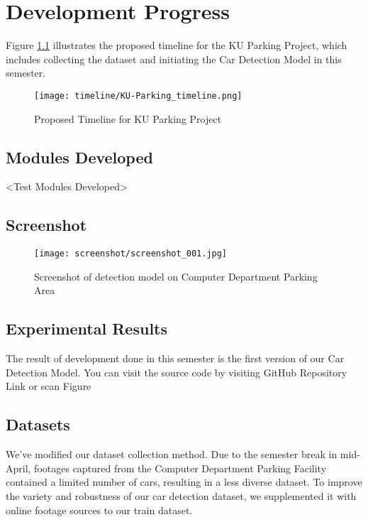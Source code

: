 \chapter{Development Progress}
\label{chap:developmentprogress}
Figure \ref{fig:timeline-dev-progress} illustrates the proposed timeline for the KU Parking Project, which includes collecting the dataset and initiating the Car Detection Model in this semester.

\begin{figure}[H]
    \centering
    \texttt{[image: timeline/KU-Parking\_timeline.png]}
    \caption{Proposed Timeline for KU Parking Project}
    \label{fig:timeline-dev-progress}
\end{figure}

\section{Modules Developed}
\label{section:module-developed}
<Test Modules Developed>

\section{Screenshot}
\label{section:screenshot}
\begin{figure}[H]
    \centering
    \texttt{[image: screenshot/screenshot\_001.jpg]}
    \caption{Screenshot of detection model on Computer Department Parking Area}
    \label{fig:screenshot001}
\end{figure}


\section{Experimental Results}
\label{section:experimental-results}
The result of development done in this semester is the first version of our Car Detection Model. You can visit the source code by visiting GitHub Repository Link or scan Figure

\section{Datasets}
\label{section:datasets}
We've modified our dataset collection method. Due to the semester break in mid-April, footages captured from the Computer Department Parking Facility contained a limited number of cars, resulting in a less diverse dataset. To improve the variety and robustness of our car detection dataset, we supplemented it with online footage sources to our train dataset.

